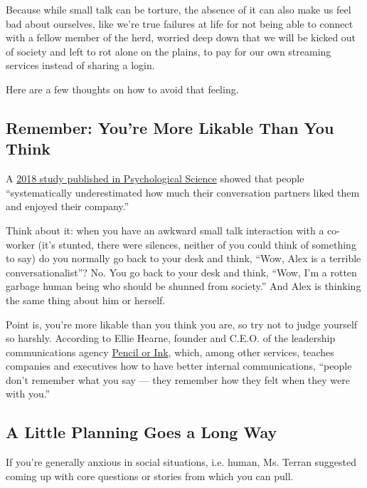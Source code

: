 Because while small talk can be torture, the absence of it can also make
us feel bad about ourselves, like we're true failures at life for not
being able to connect with a fellow member of the herd, worried deep
down that we will be kicked out of society and left to rot alone on the
plains, to pay for our own streaming services instead of sharing a
login.

Here are a few thoughts on how to avoid that feeling.

\hypertarget{remember-youre-more-likable-than-you-think}{%
\subsection{Remember: You're More Likable Than You
Think}\label{remember-youre-more-likable-than-you-think}}

A
\href{https://www.nytimes3xbfgragh.onion/2018/09/23/smarter-living/how-to-be-more-likeable.html}{2018
study published in Psychological Science} showed that people
``systematically underestimated how much their conversation partners
liked them and enjoyed their company.''

Think about it: when you have an awkward small talk interaction with a
co-worker (it's stunted, there were silences, neither of you could think
of something to say) do you normally go back to your desk and think,
``Wow, Alex is a terrible conversationalist''? No. You go back to your
desk and think, ``Wow, I'm a rotten garbage human being who should be
shunned from society.'' And Alex is thinking the same thing about him or
herself.

Point is, you're more likable than you think you are, so try not to
judge yourself so harshly. According to Ellie Hearne, founder and C.E.O.
of the leadership communications agency
\href{https://www.pencilorink.com/}{Pencil or Ink}, which, among other
services, teaches companies and executives how to have better internal
communications, ``people don't remember what you say --- they remember
how they felt when they were with you.''

\hypertarget{a-little-planning-goes-a-long-way}{%
\subsection{A Little Planning Goes a Long
Way}\label{a-little-planning-goes-a-long-way}}

If you're generally anxious in social situations, i.e. human, Ms. Terran
suggested coming up with core questions or stories from which you can
pull.

